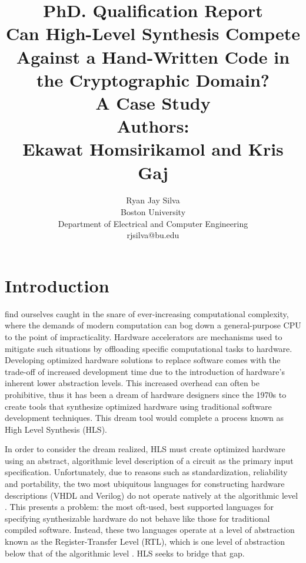 \documentclass[12pt,journal,compsoc,onecolumn]{IEEEtran}
\begin{document}
\title{PhD. Qualification Report \\ \large{\textbf{Can High-Level Synthesis Compete Against a Hand-Written Code in the Cryptographic Domain? \\ A Case Study \cite{sel}}} \\ Authors: \\ Ekawat Homsirikamol and Kris Gaj}

\author{Ryan Jay Silva \\ Boston University \\ Department of Electrical and Computer Engineering \\ rjsilva@bu.edu
}

\maketitle
\IEEEdisplaynontitleabstractindextext
\IEEEpeerreviewmaketitle


\section{Introduction}

 find ourselves caught in the snare of ever-increasing computational complexity, where the demands of modern computation can bog down a general-purpose CPU to the point of impracticality\cite{skalicky}. Hardware accelerators are mechanisms used to mitigate such situations by offloading specific computational tasks to hardware. Developing optimized hardware solutions to replace software comes with the trade-off of increased development time due to the introduction of hardware's inherent lower abstraction levels. This increased overhead can often be prohibitive, thus it has been a dream of hardware designers since the 1970s to create tools that synthesize optimized hardware using traditional software development techniques\cite{1}. This dream tool would complete a process known as High Level Synthesis (HLS).

In order to consider the dream realized, HLS must create optimized hardware using an abstract, algorithmic level description of a circuit as the primary input specification\cite{mcfarland}. Unfortunately, due to reasons such as standardization\cite{ieee}, reliability\cite{tosun} and portability\cite{churtl}, the two most ubiquitous languages for constructing hardware descriptions (VHDL and Verilog) do not operate natively at the algorithmic level \cite{Harris+Harris}. This presents a problem: the most oft-used, best supported languages for specifying synthesizable hardware do not behave like those for traditional compiled software. Instead, these two languages operate at a level of abstraction known as the Register-Transfer Level (RTL), which is one level of abstraction below that of the algorithmic level \cite{vahid}. HLS seeks to bridge that gap.
\end{document}
